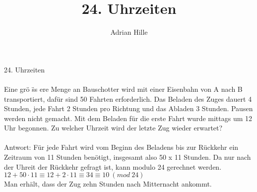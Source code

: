 \documentclass{scrartcl}
\title{24. Uhrzeiten}
\author{Adrian Hille}
\begin{document}
\Large 24. Uhrzeiten\\
\\
\normalsize
Eine gr\"o \"ss ere Menge an Bauschotter wird mit einer Eisenbahn von A nach B transportiert, daf\"ur sind 50 Fahrten erforderlich. Das Beladen des Zuges dauert 4 Stunden, jede Fahrt 2 Stunden pro Richtung und das Abladen 3 Stunden. Pausen werden nicht gemacht. Mit dem Beladen f\"ur die erste Fahrt wurde mittags um 12 Uhr begonnen. Zu welcher Uhrzeit wird der letzte Zug wieder erwartet?\\
\\
Antwort: F\"ur jede Fahrt wird vom Beginn des Beladens bis zur R\"uckkehr ein Zeitraum von 11 Stunden ben\"otigt, insgesamt also 50 x 11 Stunden. Da nur nach der Uhreit der R\"uckkehr gefragt ist, kann modulo 24 gerechnet werden.\\
$12+50 \cdot 11 \equiv 12+2 \cdot 11 \equiv 34 \equiv 10~(mod~24)$\\
Man erh\"alt, dass der Zug zehn Stunden nach Mitternacht ankommt.
\end{document}
